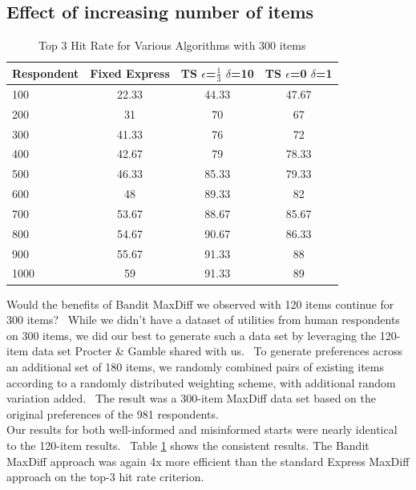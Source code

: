 \documentclass[nonblindrev]{informs3}
\begin{document}
\subsection{Effect of increasing number of items}
\begin{table}
\begin{center}
\begin{tabular}{l | c | c | c}
 Respondent& Fixed Express &  TS $\epsilon$=$\frac{1}{3}$ $\delta$=10  &TS $\epsilon$=0 $\delta$=1 \\
\hline
100	&	22.33	&	44.33	&	47.67	\\
200	&	31	&	70	&	67	\\	
300	&	41.33	&	76	&	72	\\	
400	&	42.67	&	79	&	78.33	\\	
500	&	46.33	&	85.33	&	79.33	\\
600	&	48	&	89.33	&	82	\\	
700	&	53.67	&	88.67	&	85.67	\\
800	&	54.67	&	90.67	&	86.33	\\
900	&	55.67	&	91.33	&	88	\\
1000	&	59	&	91.33	&	89	\\	
\hline
\end{tabular}
\end{center}
\caption{Top 3 Hit Rate for Various Algorithms with 300 items}
\label{table:300top3}
\end{table}
Would the benefits of Bandit MaxDiff we observed with 120 items continue for 300 items?  While we didn't have a dataset of utilities from human respondents on 300 items, we did our best to generate such a data set by leveraging the 120-item data set Procter \& Gamble shared with us.  To generate preferences across an additional set of 180 items, we randomly combined pairs of existing items according to a randomly distributed weighting scheme, with additional random variation added.  The result was a 300-item MaxDiff data set based on the original preferences of the 981 respondents.\\
Our results for both well-informed and misinformed starts were nearly identical to the 120-item results.  Table \ref{table:300top3} shows the consistent results. The Bandit MaxDiff approach was again 4x more efficient than the standard Express MaxDiff approach on the top-3 hit rate criterion. \\
\end{document}
